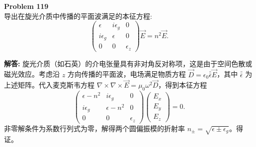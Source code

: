 \documentclass[12pt, a4paper, oneside]{ctexart}
\newenvironment{solution}{\par\noindent\textbf{解答:}\quad}{\par}
\begin{document}
\begin{mdframed}[backgroundcolor=gray!10, linewidth=0pt]
    \textbf{Problem 119} \\
    导出在旋光介质中传播的平面波满足的本征方程:
    \[
    \begin{pmatrix}
        \epsilon & i\epsilon_g & 0 \\
        i\epsilon_g & \epsilon & 0 \\
        0 & 0 & \epsilon_z
    \end{pmatrix} \vec{E} = n^2 \vec{E}.
    \]
\end{mdframed}
\begin{solution}
    旋光介质（如石英）的介电张量具有非对角反对称项，这是由于空间色散或磁光效应。考虑沿 $z$ 方向传播的平面波，电场满足物质方程 $\vec{D} = \epsilon_0 \bar{\bar{\epsilon}} \vec{E}$，其中 $\bar{\bar{\epsilon}}$ 为上述矩阵。代入麦克斯韦方程 $\nabla \times \nabla \times \vec{E} = \mu_0 \omega^2 \vec{D}$，得到本征方程
    \[
    \begin{pmatrix}
        \epsilon - n^2 & i\epsilon_g & 0 \\
        i\epsilon_g & \epsilon - n^2 & 0 \\
        0 & 0 & \epsilon_z
    \end{pmatrix} \begin{pmatrix} E_x \\ E_y \\ E_z \end{pmatrix} = 0.
    \]
    非零解条件为系数行列式为零，解得两个圆偏振模的折射率 $n_\pm = \sqrt{\epsilon \pm \epsilon_g}$。得证。
\end{solution}
\end{document}
